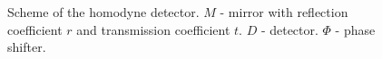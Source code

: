 \begin{figure}
\centering



\caption{Scheme of the homodyne detector. $M$ - mirror with reflection
  coefficient $r$ and transmission coefficient $t$. $D$ - detector. $\Phi$
- phase shifter.} 
\label{figPart3Squeezed_12}
\end{figure}